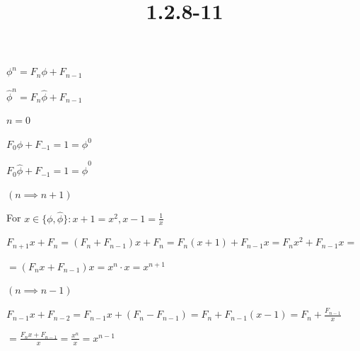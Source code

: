 \documentclass{article}
\title{1.2.8-11}
\begin{document}
\maketitle

$\phi^{n} = F_n \phi + F_{n-1}$

$\widehat{\phi}^{n} = F_n \widehat{\phi} + F_{n-1}$

$n = 0$

$F_0 \phi + F_{-1} = 1 = \phi^0$

$F_0 \widehat{\phi} + F_{-1} = 1 = \widehat{\phi}^0$

$(n \implies n + 1)$

For $x \in \{ \phi, \widehat{\phi} \}: x + 1 = x^2, x - 1 = \frac{1}{x}$

$F_{n+1} x + F_{n} = (F_n + F_{n-1})x + F_{n} = F_n(x+1) + F_{n-1} x = F_nx^2 + F_{n-1}x =$

$= (F_nx + F_{n-1})x = x^{n} \cdot x = x^{n+1}$

$(n \implies n - 1)$

$F_{n-1} x + F_{n-2} = F_{n-1} x + (F_{n} - F_{n-1}) = F_n + F_{n-1} (x - 1) = F_n + \frac{F_{n-1}}{x}$

$= \frac{F_nx + F_{n-1}}{x} = \frac{x^{n}}{x} = x^{n-1}$
\end{document}
